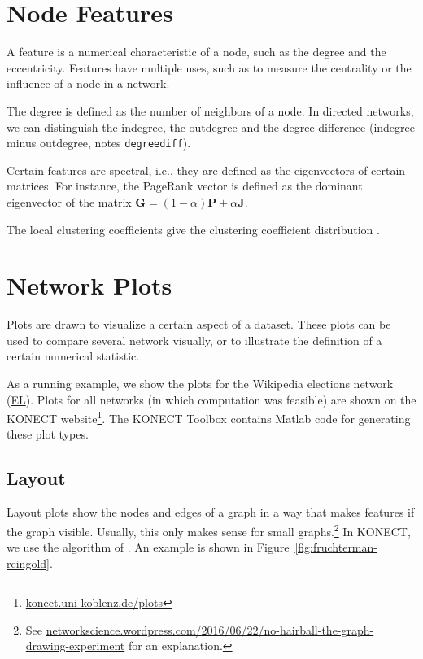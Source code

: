 \documentclass{article}
\begin{document}
\section{Node Features}
\label{sec:features}
A feature is a numerical characteristic of a node, such as the degree
and the eccentricity.  Features have multiple uses, such as to measure
the centrality or the influence of a node in a network. 

The degree is defined as the number 
of neighbors of a node.  In directed networks, we can distinguish the
indegree, the outdegree and the degree difference (indegree minus
outdegree, notes \texttt{degreediff}). 

Certain features are spectral, i.e., they are defined as the
eigenvectors of certain matrices.  For instance, the PageRank vector
 is defined as the dominant eigenvector of
the matrix $\mathbf G = (1-\alpha) \mathbf P + \alpha\mathbf J$. 

The local clustering coefficients give the clustering coefficient
distribution  \citep{b865}. 

\section{Network Plots}
\label{sec:plots}
Plots are drawn to visualize a certain aspect of a dataset. These plots
can be used to compare several network visually, or to illustrate the
definition of a certain numerical statistic.

As a running example, we show the plots for the Wikipedia elections
network
(\href{http://konect.uni-koblenz.de/networks/elec}{\textsf{EL}}).  Plots
for all networks (in which computation was feasible) are shown on the
KONECT
website\footnote{\href{http://konect.uni-koblenz.de/plots/}{konect.uni-koblenz.de/plots}}. The
KONECT Toolbox contains Matlab code for generating these plot types.

\subsection{Layout}
Layout plots show the nodes and edges of a graph in a way that makes
features if the graph visible.  Usually, this only makes sense for small
graphs.\footnote{See
  \href{https://networkscience.wordpress.com/2016/06/22/no-hairball-the-graph-drawing-experiment/}{networkscience.wordpress.com/2016/06/22/no-hairball-the-graph-drawing-experiment}
  for an explanation.}
In KONECT, we use the algorithm of \cite{b870}.  An
example is shown in Figure~\ref{fig:fruchterman-reingold}.
\end{document}
